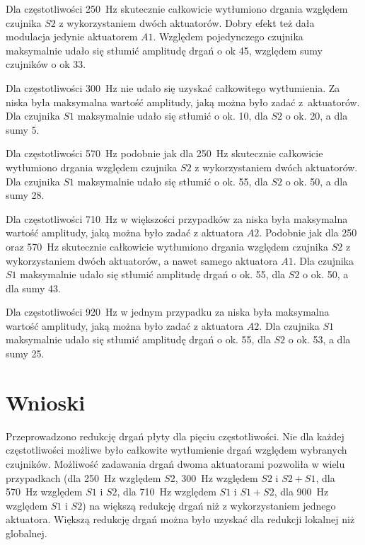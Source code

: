 \documentclass[polish,a4paper,11pt]{mwart}
\let\Oldsection\section
\renewcommand{\section}{\FloatBarrier\Oldsection}
\begin{document}
Dla częstotliwości \SI{250}{\hertz} skutecznie całkowicie wytłumiono drgania
względem czujnika $S2$ z wykorzystaniem dwóch aktuatorów. Dobry efekt też dała
modulacja jedynie aktuatorem $A1$. Względem pojedynczego czujnika
maksymalnie udało się stłumić amplitudę drgań o ok \SI{45}{\decibelV}, względem
sumy czujników o ok \SI{33}{\decibelV}.

Dla częstotliwości \SI{300}{\hertz} nie udało się uzyskać całkowitego
wytłumienia. Za niska była maksymalna wartość amplitudy, jaką można było zadać
z~aktuatorów.  Dla czujnika $S1$ maksymalnie udało się stłumić o ok.
\SI{10}{\decibelV}, dla $S2$ o ok. \SI{20}{\decibelV}, a dla sumy
\SI{5}{\decibelV}.

Dla częstotliwości \SI{570}{\hertz} podobnie jak dla \SI{250}{\hertz}
skutecznie całkowicie wytłumiono drgania względem czujnika $S2$ z wykorzystaniem
dwóch aktuatorów. Dla czujnika $S1$ maksymalnie udało się stłumić o ok.
\SI{55}{\decibelV}, dla $S2$ o ok. \SI{50}{\decibelV}, a dla sumy
\SI{28}{\decibelV}.

Dla częstotliwości \SI{710}{\hertz} w większości przypadków za niska była
maksymalna wartość amplitudy, jaką można było zadać z aktuatora $A2$.
Podobnie jak dla 250 oraz \SI{570}{\hertz} skutecznie całkowicie wytłumiono
drgania względem czujnika $S2$ z wykorzystaniem dwóch aktuatorów, a nawet samego
aktuatora $A1$. Dla czujnika $S1$ maksymalnie udało się stłumić
amplitudę drgań o ok. \SI{55}{\decibelV}, dla $S2$ o ok.
\SI{50}{\decibelV}, a dla sumy \SI{43}{\decibelV}.

Dla częstotliwości \SI{920}{\hertz} w jednym przypadku  za niska była
maksymalna wartość amplitudy, jaką można było zadać z aktuatora $A2$. Dla
czujnika $S1$ maksymalnie udało się stłumić amplitudę drgań o ok.
\SI{55}{\decibelV}, dla $S2$ o ok.  \SI{53}{\decibelV}, a dla sumy
\SI{25}{\decibelV}.

\section{Wnioski}

Przeprowadzono redukcję drgań płyty dla pięciu częstotliwości. Nie dla każdej
częstotliwości możliwe było całkowite wytłumienie drgań względem wybranych
czujników. Możliwość zadawania drgań dwoma aktuatorami pozwoliła w wielu
przypadkach (dla \SI{250}{\hertz} względem $S2$, \SI{300}{\hertz} względem $S2$
i $S2+S1$, dla \SI{570}{\hertz} względem $S1$ i $S2$, dla \SI{710}{\hertz}
względem $S1$ i $S1+S2$, dla \SI{900}{\hertz} względem $S1$ i $S2$) na większą
redukcję drgań niż z wykorzystaniem jednego aktuatora. Większą redukcję drgań
można było uzyskać dla redukcji lokalnej niż globalnej.
\end{document}
